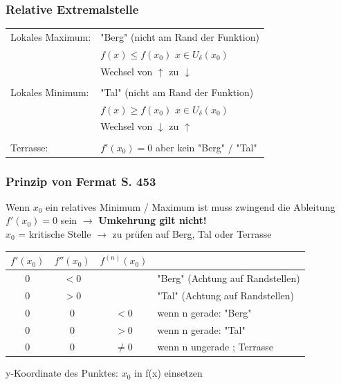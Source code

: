 			\subsubsection{Relative Extremalstelle}
		
			\begin{tabular}{ll}
			Lokales Maximum: & "Berg" (nicht am Rand der Funktion)\\ 
			& $f(x) \leq f(x_0) $ \quad $x \in U_{\delta}(x_0)$  \\
			&Wechsel von $\uparrow$ zu $\downarrow$ \\
			\\
			Lokales Minimum: & "Tal" (nicht am Rand der Funktion)\\
			& $f(x) \geq f(x_0) $ \quad $x \in U_{\delta}(x_0)$ \\
			& Wechsel von $\downarrow$ zu $\uparrow$ \\
			\\	
			Terrasse: & $f'(x_0) = 0$ aber kein "Berg" / "Tal" \\ 
			\end{tabular}
			
			
			\subsubsection{Prinzip von Fermat S. 453}	
			Wenn $x_0$ ein relatives Minimum / Maximum ist muss zwingend die Ableitung $f'(x_0) = 0$ sein	 $\rightarrow$ \textbf{Umkehrung gilt nicht!}\\
			$x_0$ = kritische Stelle $\rightarrow$ zu prüfen auf Berg, Tal oder Terrasse \\
			
			\begin{tabular}{| c | c | c | l |}
			\hline
			$f'(x_0)$ & $f''(x_0)$ & $f^{(n)}(x_0)$ & \\
			\hline
			0 & $< 0$ &  & "Berg" (Achtung auf Randstellen) \\
			\hline
			0 & $> 0$ & & "Tal" (Achtung auf Randstellen) \\
			\hline
			0 & 0 & $< 0$ & wenn n gerade: "Berg" \\
			\hline
			0 & 0 & $> 0$ & wenn n gerade: "Tal" \\
			\hline
			0 & 0 & $\neq 0$ & wenn n ungerade ; Terrasse \\
			\hline
			\end{tabular}
			
			\vspace{0.1cm}
			y-Koordinate des Punktes: $x_0$ in f(x) einsetzen					
			
